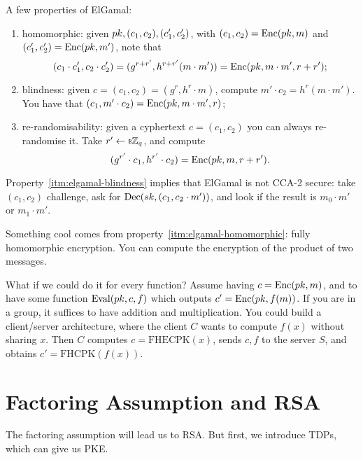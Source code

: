 A few properties of ElGamal:
\begin{enumerate}
	\item \label{itm:elgamal-homomorphic} homomorphic: given $pk, (c_1, c_2), (c_1', c_2')$, with $(c_1,c_2) = \mathrm{Enc}(pk, m)$ and $(c_1', c_2') = \mathrm{Enc}(pk, m')$, note that
		\begin{equation*}
			(c_1 \cdot c_1', c_2 \cdot c_2') = (g^{r+r'}, h^{r+r'} (m \cdot m')) = \mathrm{Enc}(pk, m \cdot m', r + r');
		\end{equation*}
	\item \label{itm:elgamal-blindness} blindness: given $c = (c_1, c_2) = (g^r, h^r \cdot m)$, compute $m' \cdot c_2 = h^r (m \cdot m')$.
		You have that $(c_1, m' \cdot c_2) = \mathrm{Enc}(pk, m \cdot m', r)$;
	\item re-randomisability: given a cyphertext $c = (c_1, c_2)$ you can always re-randomise it.
		Take $r' \leftarrow {\scriptstyle \$} {\mathbb{Z}_q}$, and compute
		\begin{equation*}
			(g^{r'} \cdot c_1, h^{r'} \cdot c_2) = \mathrm{Enc}(pk, m, r + r').
		\end{equation*}
\end{enumerate}
Property~\ref{itm:elgamal-blindness} implies that ElGamal is not \ac{CCA}-2 secure: take $(c_1, c_2)$ challenge, ask for $\mathrm{Dec}(sk, (c_1, c_2 \cdot m'))$, and look if the result is $m_0 \cdot m'$ or $m_1 \cdot m'$.

Something cool comes from property~\ref{itm:elgamal-homomorphic}: fully homomorphic encryption.
You can compute the encryption of the product of two messages.

What if we could do it for every function?
Assume having $c = \mathrm{Enc}(pk, m)$, and to have some function $\mathrm{Eval}(pk, c, f)$ which outputs $c' = \mathrm{Enc}(pk, f(m))$.
If you are in a group, it suffices to have addition and multiplication.
You could build a client/server architecture, where the client $C$ wants to compute $f(x)$ without sharing $x$.
Then $C$ computes $c = \mathrm{FHECPK}(x)$, sends $c,f$ to the server $S$, and obtains $c' = \mathrm{FHCPK}(f(x))$.

\section{Factoring Assumption and \acs{RSA}}

The factoring assumption will lead us to \ac{RSA}.
But first, we introduce \acp{TDP}, which can give us \ac{PKE}.

